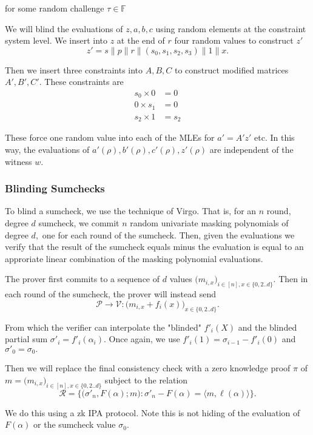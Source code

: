 for some random challenge $\tau \in \mathbb{F}$

We will blind the evaluations of $z, a, b, c$ using random elements at the constraint system level. We insert into $z$ at the end of $r$ four random values to construct $z'$
$$z' = s \| p \| r \| (s_0, s_1, s_2, s_3) \| 1 \| x.$$

Then we insert three constraints into $A, B, C$ to construct modified matrices $A', B', C'.$ These constraints are
\begin{align}
    s_0 \times 0 &= 0 \\
    0 \times s_1 &= 0 \\
    s_2 \times 1 &= s_2
\end{align}

These force one random value into each of the MLEs for $a' = A' z'$ etc. In this way, the evaluations of $a'(\rho), b'(\rho), c'(\rho), z'(\rho)$ are independent of the witness $w$.

\subsubsection{Blinding Sumchecks}
To blind a sumcheck, we use the technique of Virgo. That is, for an $n$ round, degree $d$ sumcheck, we commit $n$ random univariate masking polynomials of degree $d,$ one for each round of the sumcheck. Then, given the evaluations we verify that the result of the sumcheck equals minus the evaluation is equal to an approriate linear combination of the masking polynomial evaluations. 

The prover first commits to a sequence of $d$ values $\big( m_{i,x} \big)_{i \in [n], x \in \{ 0, 2..d\}}.$ Then in each round of the sumcheck, the prover will instead send
$$ \mathcal{P} \rightarrow \mathcal{V} : \big( m_{i,x} + f_i(x) \big)_{x \in \{0, 2..d\}}. $$

From which the verifier can interpolate the "blinded" $f'_i(X)$ and the blinded partial sum $\sigma'_i = f'_i(\alpha_i).$ Once again, we use $f'_i(1) = \sigma_{i-1} - f'_i(0)$ and $\sigma'_0 = \sigma_0.$

Then we will replace the final consistency check with a zero knowledge proof $\pi$ of $m = \big( m_{i,x} \big)_{i \in [n], x \in \{0, 2..d\}}$ subject to the relation
$$ \mathcal{R} = \bigg\{ \big(\sigma'_n, F(\alpha) ; m \big) :\sigma'_n - F(\alpha) = \big\langle m, \ell(\alpha) \big\rangle \bigg\}. $$

We do this using a zk IPA protocol. Note this is not hiding of the evaluation of $F(\alpha)$ or the sumcheck value $\sigma_0.$

